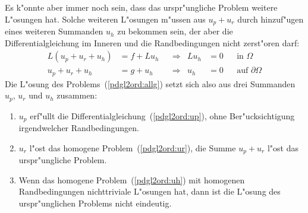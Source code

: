 Es k"onnte aber immer noch sein, dass das urspr"ungliche Problem weitere
L"osungen hat.
Solche weiteren L"osungen m"ussen aus $u_p+u_r$ durch hinzuf"ugen eines
weiteren Summanden $u_h$ zu bekommen sein, der aber die Differentialgleichung
im Inneren und die Randbedingungen nicht zerst"oren darf:
\begin{equation}
\begin{aligned}
L(u_p+u_r+u_h)&=f+Lu_h&&\Rightarrow&Lu_h&=0&&\text{in $\Omega$}\\
  u_p+u_r+u_h &=g +u_h&&\Rightarrow& u_h&=0&&\text{auf $\partial\Omega$}
\end{aligned}
\label{pdgl2ord:uh}
\end{equation}
Die L"osung des Problems~(\ref{pdgl2ord:allg}) setzt sich also aus
drei Summanden $u_p$, $u_r$ und $u_h$ zusammen:
\begin{enumerate}
\item $u_p$ erf"ullt die Differentialgleichung~(\ref{pdgl2ord:up}), ohne
Ber"ucksichtigung irgendwelcher Randbedingungen.
\item $u_r$ l"ost das homogene Problem~(\ref{pdgl2ord:ur}), die Summe
$u_p+u_r$ l"ost das urspr"ungliche Problem.
\item Wenn das homogene Problem~(\ref{pdgl2ord:uh}) mit homogenen
Randbedingungen nichttriviale L"osungen hat, dann ist die L"osung
des urspr"unglichen Problems nicht eindeutig.
\end{enumerate}


